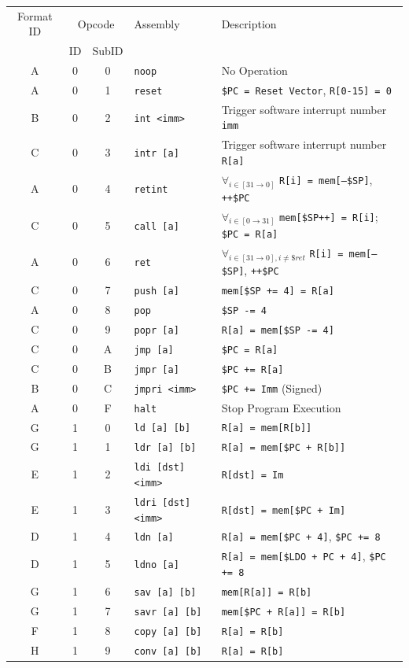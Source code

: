 \documentclass{article}
\begin{document}
\begin{table}[h!]
	\centering
	\begin{footnotesize}
		\begin{tabular}{c|cc|l|l}
			\hline
			Format ID & \multicolumn{2}{c|}{Opcode} & Assembly & Description \\
			{} & ID & SubID & {} & {} \\
			\hline
			A & 0 & 0 & \texttt{noop} & No Operation \\
			A & 0 & 1 & \texttt{reset} & \texttt{\$PC = Reset Vector}, \texttt{R[0-15] = 0} \\
			B & 0 & 2 & \texttt{int <imm>} & Trigger software interrupt number \texttt{imm} \\
			C & 0 & 3 & \texttt{intr [a]} & Trigger software interrupt number \texttt{R[a]} \\
			A & 0 & 4 & \texttt{retint} & $\forall_{i \in [31 \rightarrow 0]}$ \texttt{R[i] = mem[--\$SP]}, \texttt{++\$PC} \\
			C & 0 & 5 & \texttt{call [a]} &  $\forall_{i \in [0 \rightarrow 31]}$ \texttt{mem[\$SP++] = R[i]}; \texttt{\$PC = R[a]} \\
			A & 0 & 6 & \texttt{ret} & $\forall_{i \in [31 \rightarrow 0], i \not= \$ret}$ \texttt{R[i] = mem[--\$SP]}, \texttt{++\$PC} \\
			C & 0 & 7 & \texttt{push [a]} & \texttt{mem[\$SP += 4] = R[a]} \\
			A & 0 & 8 & \texttt{pop} & \texttt{\$SP -= 4} \\
			C & 0 & 9 & \texttt{popr [a]} & \texttt{R[a] = mem[\$SP -= 4]} \\
			C & 0 & A & \texttt{jmp [a]} & \texttt{\$PC = R[a]} \\
			C & 0 & B & \texttt{jmpr [a]} & \texttt{\$PC += R[a]} \\
			B & 0 & C & \texttt{jmpri <imm>} & \texttt{\$PC += Imm} (Signed) \\
			A & 0 & F & \texttt{halt} & Stop Program Execution \\

			G & 1 & 0 & \texttt{ld [a] [b]} & \texttt{R[a] = mem[R[b]]} \\
			G & 1 & 1 & \texttt{ldr [a] [b]} & \texttt{R[a] = mem[\$PC + R[b]]} \\
			E & 1 & 2 & \texttt{ldi [dst] <imm>} & \texttt{R[dst] = Im} \\
			E & 1 & 3 & \texttt{ldri [dst] <imm>} & \texttt{R[dst] = mem[\$PC + Im]} \\
			D & 1 & 4 & \texttt{ldn [a]} & \texttt{R[a] = mem[\$PC + 4]}, \texttt{\$PC += 8} \\
			D & 1 & 5 & \texttt{ldno [a]} & \texttt{R[a] = mem[\$LDO + PC + 4]}, \texttt{\$PC += 8} \\
			G & 1 & 6 & \texttt{sav [a] [b]} & \texttt{mem[R[a]] = R[b]} \\
			G & 1 & 7 & \texttt{savr [a] [b]} & \texttt{mem[\$PC + R[a]] = R[b]} \\
			F & 1 & 8 & \texttt{copy [a] [b]} & \texttt{R[a] = R[b]} \\
			H & 1 & 9 & \texttt{conv [a] [b]} & \texttt{R[a] = R[b]} \\


\end{tabular}
\end{footnotesize}
\end{table}
\end{document}
